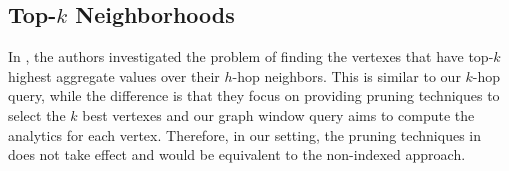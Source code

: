 \subsection{Top-$k$ Neighborhoods}
In \cite{yan2010top}, the authors investigated the problem of finding the vertexes
that have top-$k$ highest aggregate values over their $h$-hop neighbors.
This is similar to our $k$-hop query, while the difference is that they
focus on providing pruning techniques to select the $k$ best vertexes and our graph
window query aims to compute the analytics for each vertex. Therefore,
in our setting, the pruning techniques in~\cite{yan2010top} does not take effect
and would be equivalent to the non-indexed approach.%

%

